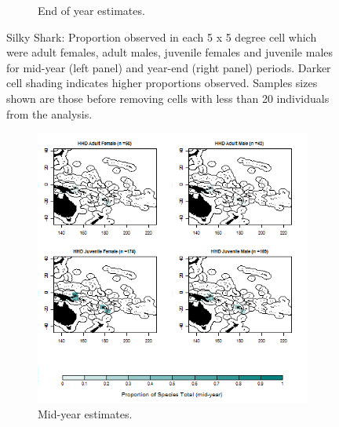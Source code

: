 \documentclass[12pt]{SCreport}
\begin{document}
\begin{landscape}
\begin{figure}
\begin{subfigure}[b]{0.6\textwidth}
       \caption{End of year estimates.}
       \label{fig:BI_21}
   \end{subfigure}
\caption{Silky Shark: Proportion observed in each 5 x 5 degree cell which were adult females, adult males, juvenile females and juvenile males for mid-year (left panel) and year-end (right panel) periods. Darker cell shading indicates higher proportions observed. Samples sizes shown are those before removing cells with less than 20 individuals from the analysis. }
\label{BI_M02} 
\end{figure}
\end{landscape}

\begin{landscape}
\begin{figure}
\centering
   \begin{subfigure}[b]{0.6\textwidth}
       \includegraphics[width=\textwidth]{../GRAPHICS/Defined/BI_24_Map_maturity_sex_HHD_MY}
       \caption{Mid-year estimates.}
       \label{fig:BI_24}
   \end{subfigure}
   \begin{subfigure}[b]{0.6\textwidth}

\end{subfigure}
\end{figure}
\end{landscape}
\end{document}
